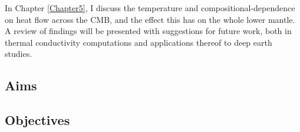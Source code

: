 In Chapter \ref{Chapter5}, I discuss the temperature and compositional-dependence on heat flow across the CMB, and the effect this has on the whole lower mantle. A review of findings will be presented with suggestions for future work, both in thermal conductivity computations and applications thereof to deep earth studies.



\subsection{Aims}

\subsection{Objectives}


